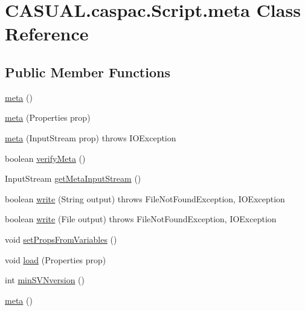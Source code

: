 \hypertarget{class_c_a_s_u_a_l_1_1caspac_1_1_script_1_1meta}{\section{C\-A\-S\-U\-A\-L.\-caspac.\-Script.\-meta Class Reference}
\label{class_c_a_s_u_a_l_1_1caspac_1_1_script_1_1meta}
}
\subsection*{Public Member Functions}
\begin{DoxyCompactItemize}
\item 
\hyperlink{class_c_a_s_u_a_l_1_1caspac_1_1_script_1_1meta_a532664de7075081f33d6d16bcd5f0839}{meta} ()
\item 
\hyperlink{class_c_a_s_u_a_l_1_1caspac_1_1_script_1_1meta_a261edd605871c12eae55492b767f5d91}{meta} (Properties prop)
\item 
\hyperlink{class_c_a_s_u_a_l_1_1caspac_1_1_script_1_1meta_a82642004af42f27e39b25701f959366c}{meta} (Input\-Stream prop)  throws I\-O\-Exception 
\item 
boolean \hyperlink{class_c_a_s_u_a_l_1_1caspac_1_1_script_1_1meta_a4340eebaf11efe0a5be240ac719287c9}{verify\-Meta} ()
\item 
Input\-Stream \hyperlink{class_c_a_s_u_a_l_1_1caspac_1_1_script_1_1meta_ac00ebebaaa934593f664e4f8a992dac1}{get\-Meta\-Input\-Stream} ()
\item 
boolean \hyperlink{class_c_a_s_u_a_l_1_1caspac_1_1_script_1_1meta_abd994423729ec381ff3d2ce236981533}{write} (String output)  throws File\-Not\-Found\-Exception, I\-O\-Exception 
\item 
boolean \hyperlink{class_c_a_s_u_a_l_1_1caspac_1_1_script_1_1meta_a24fe150d261aea726080f70c0403a81e}{write} (File output)  throws File\-Not\-Found\-Exception, I\-O\-Exception 
\item 
void \hyperlink{class_c_a_s_u_a_l_1_1caspac_1_1_script_1_1meta_a356836bc34bf0e4bc68ee064277660db}{set\-Props\-From\-Variables} ()
\item 
void \hyperlink{class_c_a_s_u_a_l_1_1caspac_1_1_script_1_1meta_a2d21562b3e0b7d4fcdb1089817ab9eca}{load} (Properties prop)
\item 
int \hyperlink{class_c_a_s_u_a_l_1_1caspac_1_1_script_1_1meta_a451f01951a3e308647fc725fdcc50b7d}{min\-S\-V\-Nversion} ()
\item 
\hyperlink{class_c_a_s_u_a_l_1_1caspac_1_1_script_1_1meta_a532664de7075081f33d6d16bcd5f0839}{meta} ()

\end{DoxyCompactItemize}
